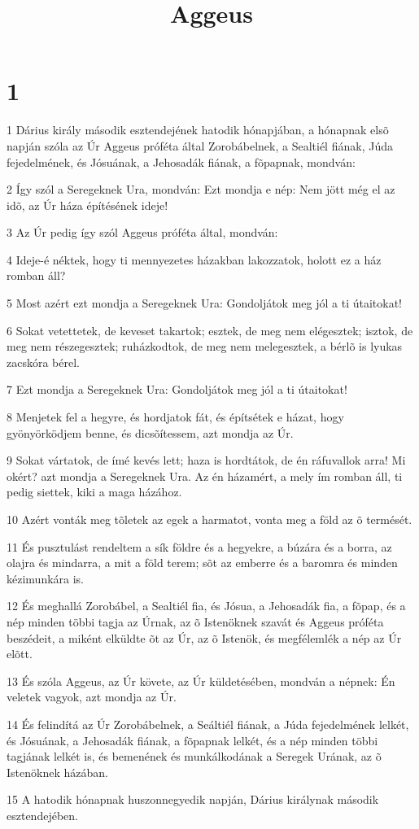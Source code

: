 

\title{Aggeus}


\chapter{1}

\par 1 Dárius király második esztendejének hatodik hónapjában, a hónapnak elsõ napján szóla az Úr Aggeus próféta  által Zorobábelnek, a Sealtiél fiának, Júda fejedelmének, és Jósuának, a Jehosadák fiának, a fõpapnak, mondván:
\par 2 Így szól a Seregeknek Ura, mondván: Ezt mondja e nép: Nem jött még el az idõ, az Úr háza építésének ideje!
\par 3 Az Úr pedig így szól Aggeus próféta által, mondván:
\par 4 Ideje-é néktek, hogy ti mennyezetes házakban lakozzatok, holott ez a ház romban áll?
\par 5 Most azért ezt mondja a Seregeknek Ura: Gondoljátok meg jól a ti útaitokat!
\par 6 Sokat vetettetek, de keveset takartok; esztek, de meg nem elégesztek; isztok, de meg nem részegesztek; ruházkodtok, de meg nem melegesztek, a bérlõ is lyukas zacskóra bérel.
\par 7 Ezt mondja a Seregeknek Ura: Gondoljátok meg jól a ti útaitokat!
\par 8 Menjetek fel a hegyre, és hordjatok fát, és építsétek e házat, hogy gyönyörködjem benne, és dicsõítessem, azt mondja az Úr.
\par 9 Sokat vártatok, de ímé kevés lett; haza is hordtátok, de én ráfuvallok arra! Mi okért? azt mondja a Seregeknek Ura. Az én házamért, a mely ím romban áll, ti pedig siettek, kiki a maga házához.
\par 10 Azért vonták meg tõletek az egek a harmatot, vonta meg a föld az õ termését.
\par 11 És pusztulást rendeltem a sík földre és a hegyekre, a búzára és a borra, az olajra és mindarra, a mit a föld terem; sõt az emberre és a baromra és minden kézimunkára is.
\par 12 És meghallá Zorobábel, a Sealtiél fia, és Jósua, a Jehosadák fia, a fõpap, és a nép minden többi tagja az Úrnak, az õ Istenöknek szavát és Aggeus próféta beszédeit, a miként elküldte õt az Úr, az õ Istenök, és megfélemlék a nép az Úr elõtt.
\par 13 És szóla Aggeus, az Úr követe, az Úr küldetésében, mondván a népnek: Én veletek vagyok, azt mondja az Úr.
\par 14 És felindítá az Úr Zorobábelnek, a Seáltiél fiának, a Júda fejedelmének lelkét, és Jósuának, a Jehosadák fiának, a fõpapnak lelkét, és a nép minden többi tagjának lelkét is, és bemenének és munkálkodának a Seregek Urának, az õ Istenöknek házában.
\par 15 A hatodik hónapnak huszonnegyedik napján, Dárius királynak második esztendejében.

